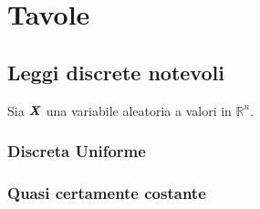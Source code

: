 \documentclass[11pt]{book}
\theoremstyle{Definizione}
\theoremstyle{TeoremaProposizioneLemmaCorollario}
\theoremstyle{OsservazioneNota}
\newcommand{\R}{\mathbb{R}}
\newcommand{\gri}[1]{\textbf{\textit{{#1}}}}
\begin{document}
\chapter{Tavole}
\section{Leggi discrete notevoli}
Sia $\gri{X}$ una variabile aleatoria a valori in $\R^n$.
\subsection{Discreta Uniforme}

\subsection{Quasi certamente costante}
\end{document}
